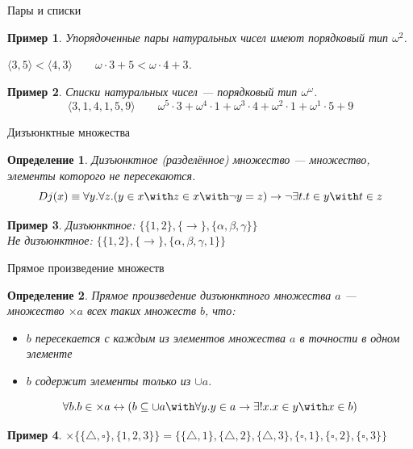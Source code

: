 \documentclass[aspectratio=169]{beamer}
\newtheorem{dfn}{Определение}[section]
\newtheorem{exm}{Пример}[section]
\begin{document}
\begin{frame}{Пары и списки}
\begin{exm}Упорядоченные пары натуральных чисел имеют порядковый тип $\omega^2$.\pause

\begin{center}$\langle 3,5 \rangle < \langle 4,3 \rangle\quad\quad\omega \cdot 3 + 5 < \omega \cdot 4 + 3$.\end{center}\end{exm}\pause

\begin{exm}Списки натуральных чисел --- порядковый тип $\omega^\omega$.
$$\langle 3,1,4,1,5,9\rangle\quad\quad \omega^5 \cdot 3 + \omega^4 \cdot 1 + \omega^3 \cdot 4 + \omega^2 \cdot 1 + \omega^1 \cdot 5 + 9$$\end{exm}
\end{frame}

\begin{frame}{Дизъюнктные множества}
\begin{dfn}Дизъюнктное (разделённое) множество --- множество, элементы которого
не пересекаются. 
$$Dj(x) \equiv \forall y.\forall z.(y \in x \with z \in x \with \neg y=z) \rightarrow 
\neg \exists t.t \in y \with t \in z$$
\end{dfn}\pause

\begin{exm}Дизъюнктное: $\{\{1,2\},\{\rightarrow\},\{\alpha,\beta,\gamma\}\}$\\ \pause
Не дизъюнктное: $\{\{1,2\},\{\rightarrow\},\{\alpha,\beta,\gamma,1\}\}$
\end{exm}
\end{frame}

\begin{frame}{Прямое произведение множеств}
\begin{dfn}Прямое произведение дизъюнктного множества $a$ --- 
множество $\times a$ всех таких множеств $b$, что:
\begin{itemize}
\item $b$ пересекается с каждым из элементов множества $a$ в точности в одном элементе
\item $b$ содержит элементы только из $\cup a$.
\end{itemize}

$$\forall b .b \in \times a \leftrightarrow (b \subseteq \cup a \with \forall y .y \in a \rightarrow \exists ! x .x \in y \with x \in b)$$
\end{dfn}\pause

\begin{exm}
$\times\{\{\triangle,\square\},\{1,2,3\}\} = \{\{\triangle,1\},\{\triangle,2\},\{\triangle,3\},\{\square,1\},\{\square,2\},\{\square,3\}\}$
\end{exm}

\end{frame}
\end{document}

